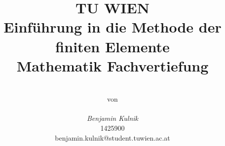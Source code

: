 \documentclass[10pt,a4paper]{article}
\title{
	{\huge TU WIEN} \\
	{\Large \textbf{Einführung in die Methode der finiten Elemente}} \\
	{\large Mathematik Fachvertiefung}}
\author{
	\\
	von \\
	\\
	\textit{Benjamin Kulnik} \\
	1425900 \\
	benjamin.kulnik@student.tuwien.ac.at \\
}
\begin{document}
	\begin{titlepage}
		\centering
		\maketitle
		\vfill
		
	\end{titlepage}
	\tableofcontents
	
	
	
	
	
	\appendix
	\listoffigures
	\listoftables
	
\end{document}
